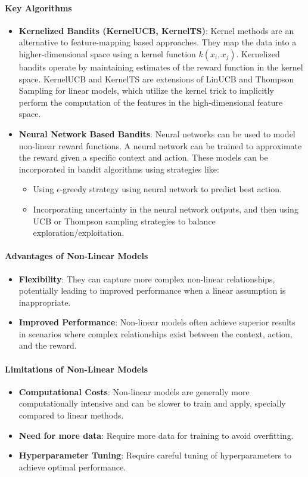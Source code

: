 \paragraph{Key Algorithms}
\begin{itemize}
    \item \textbf{Kernelized Bandits (KernelUCB, KernelTS)}:
    Kernel methods are an alternative to feature-mapping based approaches. They map the data into a higher-dimensional space using a kernel function $k(x_i,x_j)$. Kernelized bandits operate by maintaining estimates of the reward function in the kernel space. KernelUCB and KernelTS are extensions of LinUCB and Thompson Sampling for linear models, which utilize the kernel trick to implicitly perform the computation of the features in the high-dimensional feature space.

    \item \textbf{Neural Network Based Bandits}: Neural networks can be used to model non-linear reward functions. A neural network can be trained to approximate the reward given a specific context and action. These models can be incorporated in bandit algorithms using strategies like:
        \begin{itemize}
            \item Using $\epsilon$-greedy strategy using neural network to predict best action.
            \item Incorporating uncertainty in the neural network outputs, and then using UCB or Thompson sampling strategies to balance exploration/exploitation.
        \end{itemize}
\end{itemize}

\paragraph{Advantages of Non-Linear Models}
\begin{itemize}
    \item \textbf{Flexibility}: They can capture more complex non-linear relationships, potentially leading to improved performance when a linear assumption is inappropriate.
    \item \textbf{Improved Performance}: Non-linear models often achieve superior results in scenarios where complex relationships exist between the context, action, and the reward.
\end{itemize}

\paragraph{Limitations of Non-Linear Models}
\begin{itemize}
    \item \textbf{Computational Costs}: Non-linear models are generally more computationally intensive and can be slower to train and apply, specially compared to linear methods.
    \item \textbf{Need for more data}: Require more data for training to avoid overfitting.
    \item \textbf{Hyperparameter Tuning}: Require careful tuning of hyperparameters to achieve optimal performance.
\end{itemize}

